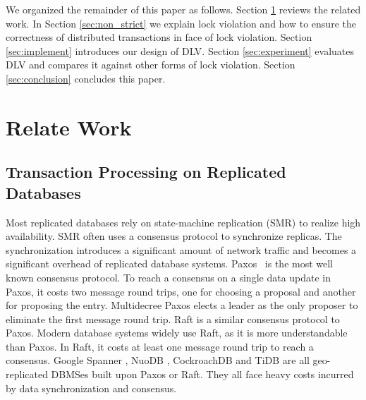 \documentclass[conference]{IEEEtran}
\begin{document}
We organized the remainder of this paper as follows.
Section \ref{sec:relate_work} reviews the related work.
In Section \ref{sec:non_strict} we explain lock violation and how to ensure the correctness of distributed transactions in face of lock violation.
Section \ref{sec:implement} introduces our design of DLV.
Section \ref{sec:experiment} evaluates DLV and compares it against other forms of lock violation.
Section \ref{sec:conclusion} concludes this paper.


\section{Relate Work}
\label{sec:relate_work}

\subsection{Transaction Processing on Replicated Databases}


Most replicated databases rely on state-machine replication (SMR) to realize high availability.
SMR often uses a consensus protocol to synchronize replicas.
The synchronization introduces a significant amount of network traffic and becomes a significant overhead of replicated database systems.
Paxos~\cite{Paxos:journals/tocs/Lamport98}\cite{PaxosSimple:conf/opodis/Lamport02} is the most well known consensus protocol.
To reach a consensus on a single data update in Paxos, it costs two message round trips, one for choosing a proposal and another for proposing the entry.
Multidecree Paxos\cite{Multidecree:journals/csur/RenesseA15} elects a leader as the only proposer to eliminate the first message round trip.
Raft\cite{Raft:conf/usenix/OngaroO14} is a similar consensus protocol to Paxos.
Modern database systems widely use Raft, as it is more understandable than Paxos.
In Raft, it costs at least one message round trip to reach a consensus.
Google Spanner \cite{Spanner:conf/osdi/CorbettDEFFFGGHHHKKLLMMNQRRSSTWW12}\cite{Spanner:conf/sigmod/BaconBBCDFFGJKL17},
NuoDB \cite{NuoDB}, CockroachDB \cite{CockroachDB} and TiDB \cite{TiDB} are all geo-replicated DBMSes built upon Paxos or Raft.
They all face heavy costs incurred by data synchronization and consensus.
\end{document}
